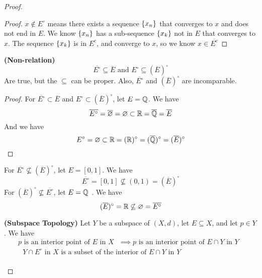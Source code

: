 \documentclass{report}
\begin{document}
\begin{proof}
\begin{proof}
$x\not \in E^\circ $ means there exists a sequence $\{ x_n \}$ that converges to $x$ and does not end in  $E$. We know $\{ x_n \}$ has a sub-sequence $\{ x_k \}$ not in $E$ that converges to $x$. The sequence $\{ x_k \}$ is in $E^c$, and converge to $x$, so we know  $x\in \overline{E^c}$
\end{proof}
\begin{theorem}
\label{1.3.7}
\textbf{(Non-relation)}  
\begin{equation}
  \overline{E^\circ }\subseteq \overline{E}\text{ and }E^\circ \subseteq (\overline{E})^\circ 
\end{equation}
Are true, but the $\subseteq$ can be proper. Also, $\overline{E^\circ }$ and $(\overline{E})^\circ $ are incomparable.
\end{theorem}
\begin{proof}
For $\overline{E^\circ }\subset \overline{E}$ and $E^\circ \subset (\overline{E})^\circ $, let $E=\mathbb{Q}$. We have
 \begin{equation}
\overline{E^\circ }=\overline{\varnothing}=\varnothing \subset \mathbb{R}=\overline{\mathbb{Q}}=\overline{E}
\end{equation}
And we have
\begin{equation}
E^\circ = \varnothing \subset \mathbb{R}=(\mathbb{R})^\circ  = (\overline{\mathbb{Q}})^\circ = (\overline{E})^\circ 
\end{equation}
\end{proof}
For $\overline{E^\circ }\not \subseteq (\overline{E})^\circ $, let $E=[0,1]$. We have
\begin{equation}
\overline{E^\circ }=[0,1]\not\subseteq (0,1)=(\overline{E})^\circ 
\end{equation}
For $(\overline{E})^\circ \not\subseteq \overline{E^\circ }$, let $E=\mathbb{Q}$ . We have
\begin{equation}
  (\overline{E})^\circ =\mathbb{R} \not\subseteq \varnothing= \overline{E^\circ }
\end{equation}
\begin{theorem}
\label{3.3.2}
\textbf{(Subspace Topology)} Let $Y$ be a subspace of $(X,d)$, let $E\subseteq X$, and let $p\in  Y$. We have
\begin{gather}
p\text{ is an interior point of $E$ in $X$ }\implies p\text{ is an interior point of $E\cap Y$ in $Y$ } \\
\text{ $Y\cap E^\circ $ in $X$ is a subset of the interior of $E\cap Y$ in $Y$ }\\

\end{gather}
\end{theorem}
\end{proof}
\end{document}
